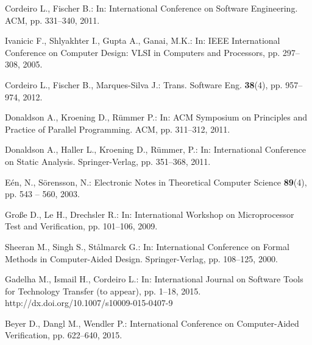 \documentclass{acm_sen_article}
\begin{document}
\begin{thebibliography}{1}
Cordeiro L., Fischer B.:
\newblock In: International Conference on Software Engineering. ACM,  pp. 331--340, 2011.

Ivanicic F., Shlyakhter I., Gupta A., Ganai, M.K.:
\newblock In: IEEE International Conference on Computer Design: VLSI in Computers and Processors, pp. 297--308, 2005.

Cordeiro L., Fischer B., Marques{-}Silva J.:
 Trans. Software Eng. \textbf{38}(4), pp. 957--974, 2012.

Donaldson A., Kroening D., R{\"{u}}mmer P.:
\newblock In: ACM Symposium on Principles and Practice of Parallel Programming. ACM, pp. 311--312, 2011.

Donaldson A., Haller L., Kroening D., R{\"{u}}mmer, P.:
\newblock In: International Conference on Static Analysis. Springer-Verlag, pp. 351--368, 2011.

E{\'{e}}n, N., S{\"{o}}rensson, N.:
\newblock Electronic Notes in Theoretical Computer Science \textbf{89}(4), pp. 543 -- 560, 2003.

Gro{\ss}e D., Le H., Drechsler R.:
\newblock In: International Workshop on Microprocessor Test and Verification, pp. 101--106, 2009.

Sheeran M., Singh S., St{\aa}lmarck G.:
\newblock In: International Conference on Formal Methods in Computer-Aided Design. Springer-Verlag, pp. 108--125, 2000.

Gadelha M., Ismail H., Cordeiro L.:
\newblock In: International Journal on Software Tools for Technology Transfer (to appear), pp. 1--18, 2015.
\newblock http://dx.doi.org/10.1007/s10009-015-0407-9

Beyer D., Dangl M., Wendler P.:
\newblock International Conference on Computer-Aided Verification, pp. 622--640, 2015.


\end{thebibliography}
\end{document}
